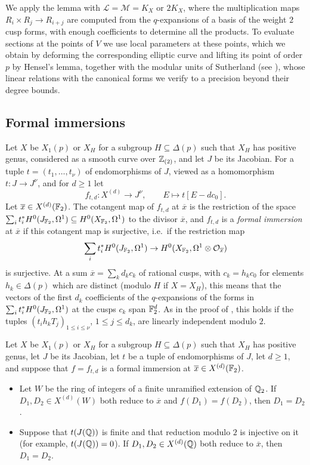 We apply the lemma with $\mathcal L=\mathcal M=K_X$ or $2K_X$, where the multiplication maps $R_i\times R_j\to R_{i+j}$ are computed from the $q$-expansions of a basis of the weight $2$ cusp forms, with enough coefficients to determine all the products. To evaluate sections at the points of $V$ we use local parameters at these points, which we obtain by deforming the corresponding elliptic curve and lifting its point of order $p$ by Hensel's lemma, together with the modular units of Sutherland \cite{sutherland} (see \cite[Section 2]{DvH}), whose linear relations with the canonical forms we verify to a precision beyond their degree bounds.

\subsection{Formal immersions}
Let $X$ be $X_1(p)$ or $X_H$ for a subgroup $H\subseteq\Delta(p)$ such that $X_H$ has positive genus, considered as a smooth curve over $\mathbb{Z}_{(2)}$, and let $J$ be its Jacobian. For a tuple $t=(t_1,\dots,t_\nu)$ of endomorphisms of $J$, viewed as a homomorphism $t:J\to J^\nu$, and for $d\geq1$ let
$$f_{t,d}:X^{(d)}\to J^\nu,\qquad E\mapsto t[E-dc_0].$$
Let $\overline x\in X^{(d)}(\mathbb{F}_2)$. The cotangent map of $f_{t,d}$ at $\overline x$ is the restriction of the space $\sum_it_i^*H^0(J_{\mathbb{F}_2},\Omega^1)\subseteq H^0(X_{\mathbb{F}_2},\Omega^1)$ to the divisor $\overline x$, and $f_{t,d}$ is a \textit{formal immersion} at $\overline x$ if this cotangent map is surjective, i.e.\ if the restriction map
$$\sum_it_i^*H^0(J_{\mathbb{F}_2},\Omega^1)\to H^0(X_{\mathbb{F}_2},\Omega^1\otimes\mathcal O_{\overline x})$$
is surjective. At a sum $\overline x=\sum_k d_kc_k$ of rational cusps, with $c_k=h_kc_0$ for elements $h_k\in\Delta(p)$ which are distinct (modulo $H$ if $X=X_H$), this means that the vectors of the first $d_k$ coefficients of the $q$-expansions of the forms in $\sum_it_i^*H^0(J_{\mathbb{F}_2},\Omega^1)$ at the cusps $c_k$ span $\mathbb{F}_2^{d}$. As in the proof of \cite[Proposition 5.3]{DKSS}, this holds if the tuples $(t_ih_kT_j)_{1\leq i\leq\nu}$, $1\leq j\leq d_k$, are linearly independent modulo $2$.

\begin{lemma}\label{lem:fi}
Let $X$ be $X_1(p)$ or $X_H$ for a subgroup $H\subseteq\Delta(p)$ such that $X_H$ has positive genus, let $J$ be its Jacobian, let $t$ be a tuple of endomorphisms of $J$, let $d\geq1$, and suppose that $f=f_{t,d}$ is a formal immersion at $\overline x\in X^{(d)}(\mathbb{F}_2)$.
\begin{itemize}
\item[a)] Let $W$ be the ring of integers of a finite unramified extension of $\mathbb{Q}_2$. If $D_1,D_2\in X^{(d)}(W)$ both reduce to $\overline x$ and $f(D_1)=f(D_2)$, then $D_1=D_2$.
\item[b)] Suppose that $t(J(\mathbb{Q}))$ is finite and that reduction modulo $2$ is injective on it (for example, $t(J(\mathbb{Q}))=0$). If $D_1,D_2\in X^{(d)}(\mathbb{Q})$ both reduce to $\overline x$, then $D_1=D_2$.
\end{itemize}
\end{lemma}


